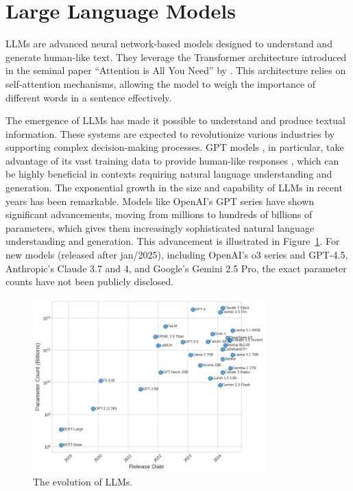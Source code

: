     \section{Large Language Models}         

        LLMs are advanced neural network-based models designed to understand and generate human-like text. 
        They leverage the Transformer architecture introduced in the seminal paper \enquote{Attention is All You Need} by \citet{Vaswani2017}. 
        This architecture relies on self-attention mechanisms, allowing the model to weigh the importance of different words in a sentence effectively. 

        The emergence of LLMs has made it possible to understand and produce textual information. 
        These systems are expected to revolutionize various industries by supporting complex decision-making processes. GPT models \citep{OpenAI2023}, in particular, take advantage of its vast training data to provide human-like responses \citep{Mosser2024}, which can be highly beneficial in contexts requiring natural language understanding and generation. The exponential growth in the size and capability of LLMs in recent years has been remarkable. Models like OpenAI's GPT series have shown significant advancements, moving from millions to hundreds of billions of parameters, which gives them increasingly sophisticated natural language understanding and generation. This advancement is illustrated in Figure~\ref{fig:llm_evolution}. For new models (released after jan/2025), including OpenAI's o3 series and GPT-4.5, Anthropic's Claude 3.7 and 4, and Google's Gemini 2.5 Pro, the exact parameter counts have not been publicly disclosed. 


        \begin{figure}[ht]
            \centering
            \includegraphics[width=0.8\textwidth]{images/llm_evolution.png}
            \caption{The evolution of LLMs.}
            \label{fig:llm_evolution}
        \end{figure}
                
